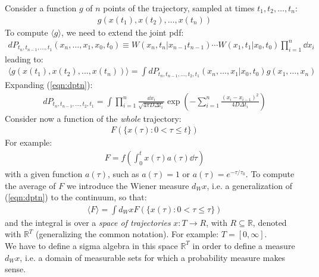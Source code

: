 \documentclass[../template.tex]{subfiles}
\begin{document}
Consider a function $g$ of $n$ points of the trajectory, sampled at times $t_1, t_2, \dots, t_n$:
\begin{align*}
    g(x(t_1 ), x(t_2 ), \dots, x(t_n))
\end{align*}   
To compute $\langle g \rangle$, we need to extend the joint pdf:
\begin{align}
    dP_{t_n, t_{n-1}, \dots, t_1} (x_n,\dots, x_1, x_0, t_0) \equiv W(x_n, t_n |x_{n-1}t_{n-1}) \cdots W(x_1, t_1|x_0, t_0) \prod_{i=1}^n \dd{x_i}
    \label{eqn:dptn}
\end{align} 
leading to:
\begin{align*}
    \langle g(x(t_1 ), x(t_2), \dots, x(t_n)) \rangle = \int dP_{t_n, t_{n-1}, \dots, t_2, t_1} (x_n, \dots, x_1|x_0, t_0) g(x_1, \dots, x_n)
\end{align*}
Expanding (\ref{eqn:dptn}):
\begin{align*}
    dP_{t_n, t_{n-1}, \dots, t_2, t_1} = \int \prod_{i=1}^n \frac{\dd{x_i}}{\sqrt{4 \pi D \Delta t_i}} \exp\left(-\sum_{i=1}^n \frac{(x_i - x_{i-1})^2}{4 D \Delta t_i} \right) 
\end{align*}
Consider now a function of the \textit{whole} trajectory:
\begin{align*}
    F(\{x(\tau) \colon 0 < \tau \leq t \})
\end{align*} 
For example:
\begin{align*}
    F = f\left(\int_0^t x(\tau) a(\tau) \dd{\tau}\right)
\end{align*}
with a given function $a(\tau)$, such as $a(\tau) = 1$ or $a(\tau) = e^{-\tau/\tau_0}$. To compute the average of $F$ we introduce the Wiener measure $d_W x$, i.e. a generalization of (\ref{eqn:dptn}) to the continuum, so that:
\begin{align*}
    \langle F \rangle = \int d_W x F(\{x(\tau)\colon 0 < \tau \leq \tau\})
\end{align*}
and the integral is over a \textit{space of trajectories} $x\colon T \to R$, with $R \subseteq \mathbb{R}$, denoted with $\mathbb{R}^T$ (generalizing the common notation). For example: $T = [0, \infty]$.\\

We have to define a sigma algebra in this space $\mathbb{R}^T$ in order to define a measure $d_W x$, i.e. a domain of measurable sets for which a probability measure makes sense.\\ %
\end{document}
